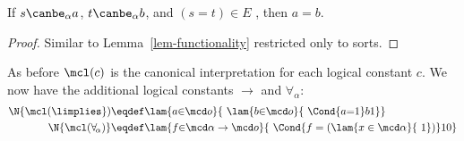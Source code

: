 \begin{lem}[Functionality]
  \label{lem-efo-functionality}
  If $s\canbe_\alpha a$, $t\canbe_\alpha b$, and
  $(s{=}t)\in E$ , then $a=b$.
\end{lem}
\begin{proof}  Similar to Lemma~\ref{lem-functionality}
  restricted only to sorts.
\end{proof}

As before $\mcl(c)$ is the canonical interpretation for each logical constant $c$.
We now have the additional logical constants $\to$ and $\forall_{\!\alpha}$:
\begin{align*}
  \N{\mcl({\limplies}})&\eqdef\lam{a{\in}\mcd o}{~\lam{b{\in}\mcd o}{~\Cond{a{=}1}b1}}\\
  \N{\mcl({\forall_{\!\alpha}})}&\eqdef\lam{f{\in}\mcd\alpha\to\mcd o}{~\Cond{f = (\lam{x\in\mcd\alpha}{~1})}10}
\end{align*}

